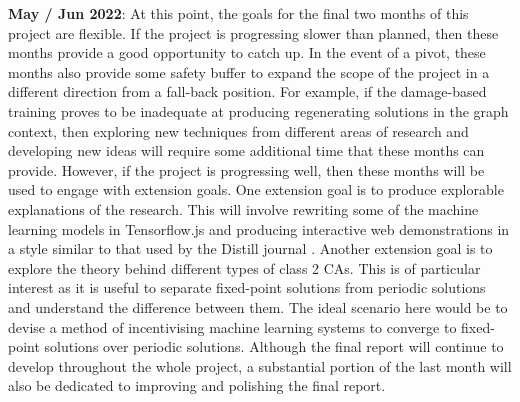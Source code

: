 \textbf{May / Jun 2022}: At this point, the goals for the final two months of this project are flexible. If the project is progressing slower than planned, then these months provide a good opportunity to catch up. In the event of a pivot, these months also provide some safety buffer to expand the scope of the project in a different direction from a fall-back position. For example, if the damage-based training proves to be inadequate at producing regenerating solutions in the graph context, then exploring new techniques from different areas of research and developing new ideas will require some additional time that these months can provide.
However, if the project is progressing well, then these months will be used to engage with extension goals.
One extension goal is to produce explorable explanations of the research.
This will involve rewriting some of the machine learning models in Tensorflow.js and producing interactive web demonstrations in a style similar to that used by the Distill journal \cite{distill}.
Another extension goal is to explore the theory behind different types of class 2 CAs.
This is of particular interest as it is useful to separate fixed-point solutions from periodic solutions and understand the difference between them.
The ideal scenario here would be to devise a method of incentivising machine learning systems to converge to fixed-point solutions over periodic solutions.
Although the final report will continue to develop throughout the whole project, a substantial portion of the last month will also be dedicated to improving and polishing the final report.
    
